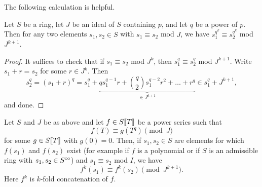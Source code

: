 \documentclass[../main.tex]{subfiles}
\begin{document}
The following calculation is helpful.
\begin{lem}\label{lem:cryscalc}
  Let $S$ be a ring, let $J$ be an ideal of $S$ containing $p$, and let $q$ be
  a power of $p$. 
  Then for any two elements $s_1, s_2 \in S$ with $s_1 \equiv s_2$ mod $J$, we have 
  $s_1^{q^k} \equiv s_2^{q^k}$ mod $J^{k+1}$. 
\begin{proof}
  It suffices to check that if $s_1 \equiv s_2$ mod $J^k$, then $s_1^q \equiv s_2^q$
  mod $J^{k+1}$. Write $s_1 + r = s_2$ for some $r \in J^k$. Then 
  \begin{equation*}
    s_2^q = (s_1 + r)^q = s_1^q + \underbrace{qs_1^{q-1} r + \binom q2
    s_1^{q-2}r^2 + \dots + r^q }_{\in J^{k+1}} \in s_1^q + J^{k+1},
  \end{equation*}
  and done.
\end{proof}
\end{lem}
\begin{cor}\label{cor:crystildecalc}
  Let $S$ and $J$ be as above and let $f \in S \llbracket T \rrbracket$ be a power series such
  that 
  \begin{equation*}
    f(T) \equiv g(T^{q}) \pmod J
  \end{equation*}
  for some $g \in S\llbracket T \rrbracket$ with $g(0) = 0$. Then, if $s_1, s_2 \in S$
  are elements for which $f(s_1)$ and $f(s_2)$ exist (for example if $f$ is a
  polynomial or if $S$ is an admissible ring with $s_1, s_2 \in S^{\circ \hspace{-0.5pt} \circ}$) and
  $s_1 \equiv s_2$ mod $I$, we have
  \begin{equation*}
    f^k(s_1) \equiv f^k(s_2) \pmod {J^{k+1}}.
  \end{equation*}
  Here $f^k$ is $k$-fold concatenation of $f$. 
\end{cor}
\end{document}
